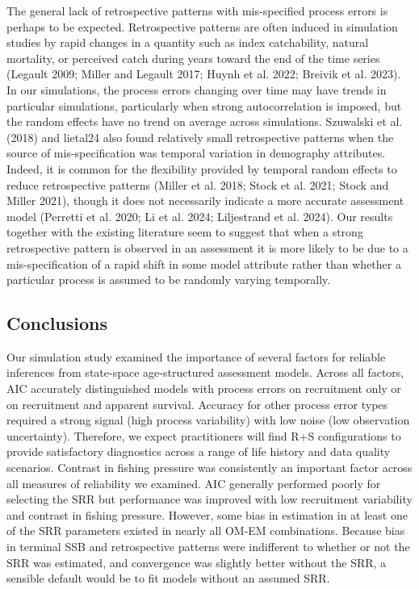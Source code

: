 \documentclass[
  12pt,
]{article}
\begin{document}
The general lack of retrospective patterns with mis-specified process
errors is perhaps to be expected. Retrospective patterns are often
induced in simulation studies by rapid changes in a quantity such as
index catchability, natural mortality, or perceived catch during years
toward the end of the time series (Legault 2009; Miller and Legault
2017; Huynh et al. 2022; Breivik et al. 2023). In our simulations, the
process errors changing over time may have trends in particular
simulations, particularly when strong autocorrelation is imposed, but
the random effects have no trend on average across simulations.
Szuwalski et al. (2018) and lietal24 also found relatively small
retrospective patterns when the source of mis-specification was temporal
variation in demography attributes. Indeed, it is common for the
flexibility provided by temporal random effects to reduce retrospective
patterns (Miller et al. 2018; Stock et al. 2021; Stock and Miller 2021),
though it does not necessarily indicate a more accurate assessment model
(Perretti et al. 2020; Li et al. 2024; Liljestrand et al. 2024). Our
results together with the existing literature seem to suggest that when
a strong retrospective pattern is observed in an assessment it is more
likely to be due to a mis-specification of a rapid shift in some model
attribute rather than whether a particular process is assumed to be
randomly varying temporally.

\hypertarget{conclusions}{%
\subsection*{Conclusions}\label{conclusions}}

Our simulation study examined the importance of several factors for
reliable inferences from state-space age-structured assessment models.
Across all factors, AIC accurately distinguished models with process
errors on recruitment only or on recruitment and apparent survival.
Accuracy for other process error types required a strong signal (high
process variability) with low noise (low observation uncertainty).
Therefore, we expect practitioners will find R+S configurations to
provide satisfactory diagnostics across a range of life history and data
quality scenarios. Contrast in fishing pressure was consistently an
important factor across all measures of reliability we examined. AIC
generally performed poorly for selecting the SRR but performance was
improved with low recruitment variability and contrast in fishing
pressure. However, some bias in estimation in at least one of the SRR
parameters existed in nearly all OM-EM combinations. Because bias in
terminal SSB and retrospective patterns were indifferent to whether or
not the SRR was estimated, and convergence was slightly better without
the SRR, a sensible default would be to fit models without an assumed
SRR.
\end{document}
